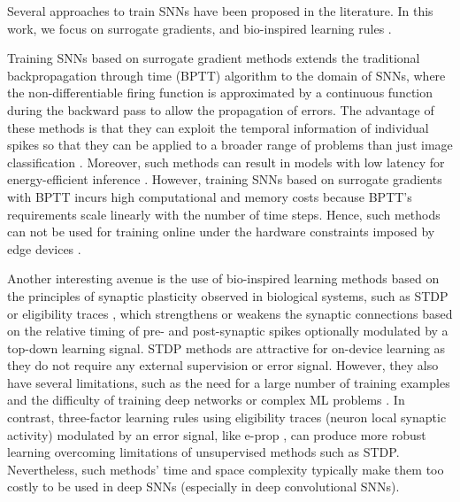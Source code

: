 \documentclass[10pt]{article} %
\begin{document}
    Several approaches to train SNNs have been proposed in the literature. 
    In this work, we focus on surrogate gradients\citep{Neftci2019SurrogateNetworks, Li2021DifferentiableNetworks}, and bio-inspired learning rules \citep{Diehl2015UnsupervisedPlasticityb,Thiele2018Event-basedSTDP, Kheradpisheh2018STDP-basedRecognition, Bellec2020ANeurons}.
    

    Training SNNs based on surrogate gradient methods \citep{Neftci2019SurrogateNetworks, Li2021DifferentiableNetworks} extends the traditional backpropagation through time (BPTT) algorithm to the domain of SNNs, where the non-differentiable firing function is approximated by a continuous function during the backward pass to allow the propagation of errors. 
    The advantage of these methods is that they can exploit the temporal information of individual spikes so that they can be applied to a broader range of problems than just image classification \citep{Paredes-Valles2021BackConstancy, Cramer2022TheNetworks}.
    Moreover, such methods can result in models with low latency for energy-efficient inference \citep{Fang2021DeepNetworks}. 
    However, training SNNs based on surrogate gradients with BPTT incurs high computational and memory costs because BPTT's requirements scale linearly with the number of time steps. 
    Hence, such methods can not be used for training online under the hardware constraints imposed by edge devices \citep{Neftci2019SurrogateNetworks}.
    
    Another interesting avenue is the use of bio-inspired learning methods based on the principles of synaptic plasticity observed in biological systems, such as STDP \citep{Bi1998SynapticType, Song2000CompetitivePlasticity}  or eligibility traces \citep{Gerstner2014, Gerstner2018EligibilityRules}, which strengthens or weakens the synaptic connections based on the relative timing of pre- and post-synaptic spikes optionally modulated by a top-down learning signal. 
    STDP methods are attractive for on-device learning as they do not require any external supervision or error signal.  
    However, they also have several limitations, such as the need for a large number of training examples and the difficulty of training deep networks or complex ML problems \citep{Diehl2015UnsupervisedPlasticityb}.
    In contrast, three-factor learning rules using eligibility traces (neuron local synaptic activity) modulated by an error signal, like e-prop \citep{Bellec2020ANeurons}, can produce more robust learning overcoming limitations of unsupervised methods such as STDP.
    Nevertheless, such methods' time and space complexity typically make them too costly to be used in deep SNNs (especially in deep convolutional SNNs).
    
\end{document}
